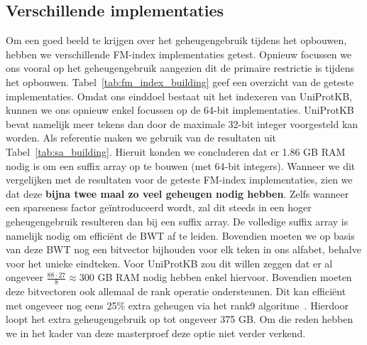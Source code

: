 \subsection{Verschillende implementaties}\label{subsec:verschillende-implementaties}
Om een goed beeld te krijgen over het geheugengebruik tijdens het opbouwen, hebben we verschillende FM-index implementaties getest.
Opnieuw focussen we ons vooral op het geheugengebruik aangezien dit de primaire restrictie is tijdens het opbouwen.
Tabel~\ref{tab:fm_index_building} geef een overzicht van de geteste implementaties.
Omdat ons einddoel bestaat uit het indexeren van UniProtKB, kunnen we ons opnieuw enkel focussen op de 64-bit implementaties.
UniProtKB bevat namelijk meer tekens dan door de maximale 32-bit integer voorgesteld kan worden.
Als referentie maken we gebruik van de resultaten uit Tabel~\ref{tab:sa_building}.
Hieruit konden we concluderen dat er 1.86 GB RAM nodig is om een suffix array op te bouwen (met 64-bit integers).
Wanneer we dit vergelijken met de resultaten voor de geteste FM-index implementaties, zien we dat deze \textbf{bijna twee maal zo veel geheugen nodig hebben}.
Zelfs wanneer een sparseness factor geïntroduceerd wordt, zal dit steeds in een hoger geheugengebruik resulteren dan bij een suffix array.
De volledige suffix array is namelijk nodig om efficiënt de BWT af te leiden.
Bovendien moeten we op basis van deze BWT nog een bitvector bijhouden voor elk teken in ons alfabet, behalve voor het unieke eindteken.
Voor UniProtKB zou dit willen zeggen dat er al ongeveer $\frac{88 \cdot 27}{8} \approx 300$ GB RAM nodig hebben enkel hiervoor.
Bovendien moeten deze bitvectoren ook allemaal de rank operatie ondersteunen.
Dit kan efficiënt met ongeveer nog eens 25\% extra geheugen via het rank9 algoritme~\cite{CCB_course, rank9}.
Hierdoor loopt het extra geheugengebruik op tot ongeveer 375 GB\@.
Om die reden hebben we in het kader van deze masterproef deze optie niet verder verkend.

